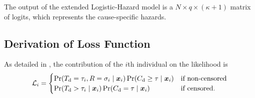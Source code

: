 \begin{marginfigure}
\caption[Illustration of the Extended Logistic-Hazard model]{
    The output of the extended Logistic-Hazard model is a
    \(N \times q \times (\kappa + 1)\) matrix of logits, which 
    represents the cause-specific hazards.}
\label{fig:ext-loghaz}
\end{marginfigure}%

\subsection{Derivation of Loss Function}
\newcommand{\lambdanull}[1]{\lambda_\varnothing(#1 \giv \vec{x}_i)}

As detailed in \textcite{tutzModeling2016}, 
the contribution of 
the \(i\)th individual on the likelihood is
%
\begin{equation}
    \mathcal{L}_{i} =
    \begin{cases}
        \Pr({T_{\mathrm{d}}} = \tau_{i}, R = \sigma_i \mid \bm{x}_i) 
        \Pr({C_{\mathrm{d}}} \geq \tau \mid \bm{x}_i) 
        & \text{if non-censored} \\
        \Pr({T_{\mathrm{d}}} > \tau_{i} \mid \bm{x}_i) 
        \Pr({C_{\mathrm{d}}} = \tau \mid \bm{x}_i)                  
        & \text{if censored.}
    \end{cases}
\end{equation}

